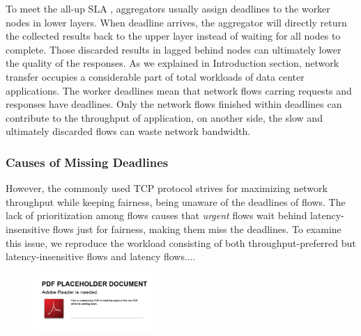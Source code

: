To meet the all-up SLA \cite{DCTCP}, aggregators usually assign deadlines to the worker nodes in lower layers. When deadline arrives, the aggregator will directly return the collected results back to the upper layer instead of waiting for all nodes to complete. Those discarded results in lagged behind nodes can ultimately lower the quality of the responses. As we explained in Introduction section, network transfer occupies a considerable part of total workloads of data center applications. The worker deadlines mean that network flows carring requests and responses have deadlines. Only the network flows finished within deadlines can contribute to the throughput of application, on another side, the slow and ultimately discarded flows can waste network bandwidth.

\subsubsection{Causes of Missing Deadlines}

However, the commonly used TCP protocol strives for maximizing network throughput while keeping fairness, being unaware of the deadlines of flows. The lack of prioritization among flows causes that \emph{urgent} flows wait behind latency-insensitive flows just for fairness, making them miss the deadlines. To examine this issue, we reproduce the workload consisting of both throughput-preferred but latency-insensitive flows and latency flows....


\begin{figure}
  \centering
  \includegraphics[width=0.4\textwidth]{pic/placeholder}\\
  \caption{}
  \label{fig:par-agg}
\end{figure}

